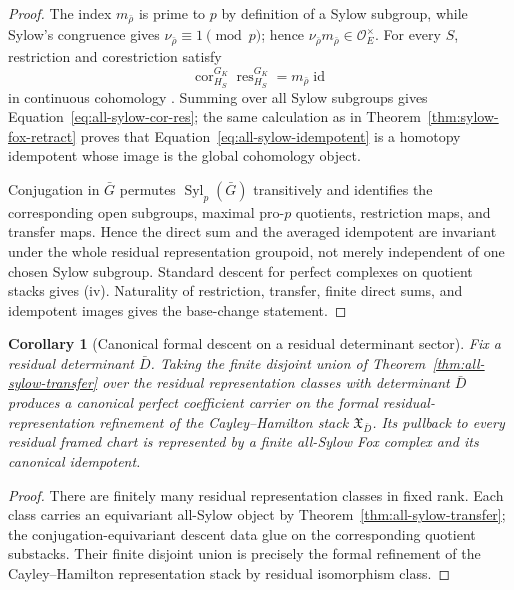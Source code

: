 \documentclass[11pt]{article}
\newtheorem{corollary}[theorem]{Corollary}
\theoremstyle{definition}
\begin{document}
\begin{proof}
The index $m_{\bar\rho}$ is prime to $p$ by definition of a Sylow subgroup, while Sylow's congruence gives
$\nu_{\bar\rho}\equiv1\pmod p$; hence
$\nu_{\bar\rho}m_{\bar\rho}\in\mathcal O_E^\times$.
For every $S$, restriction and corestriction satisfy
\[
 \operatorname{cor}_{H_S}^{G_K}
 \operatorname{res}_{H_S}^{G_K}
 =m_{\bar\rho}\operatorname{id}
\]
in continuous cohomology \cite{BrownCohomology}.  Summing over all Sylow subgroups gives Equation~\eqref{eq:all-sylow-cor-res}; the same calculation as in Theorem~\ref{thm:sylow-fox-retract} proves that Equation~\eqref{eq:all-sylow-idempotent} is a homotopy idempotent whose image is the global cohomology object.

Conjugation in $\bar G$ permutes $\operatorname{Syl}_p(\bar G)$ transitively and identifies the corresponding open subgroups, maximal pro-$p$ quotients, restriction maps, and transfer maps.  Hence the direct sum and the averaged idempotent are invariant under the whole residual representation groupoid, not merely independent of one chosen Sylow subgroup.  Standard descent for perfect complexes on quotient stacks gives (iv).  Naturality of restriction, transfer, finite direct sums, and idempotent images gives the base-change statement.
\end{proof}

\begin{corollary}[Canonical formal descent on a residual determinant sector]\label{cor:all-sylow-det-formal}
Fix a residual determinant $\bar D$.  Taking the finite disjoint union of Theorem~\ref{thm:all-sylow-transfer} over the residual representation classes with determinant $\bar D$ produces a canonical perfect coefficient carrier on the formal residual-representation refinement of the Cayley--Hamilton stack $\mathfrak X_{\bar D}$.  Its pullback to every residual framed chart is represented by a finite all-Sylow Fox complex and its canonical idempotent.
\end{corollary}

\begin{proof}
There are finitely many residual representation classes in fixed rank.  Each class carries an equivariant all-Sylow object by Theorem~\ref{thm:all-sylow-transfer}; the conjugation-equivariant descent data glue on the corresponding quotient substacks.  Their finite disjoint union is precisely the formal refinement of the Cayley--Hamilton representation stack by residual isomorphism class.
\end{proof}
\end{document}
